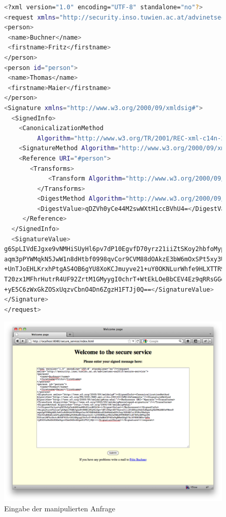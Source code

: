 \documentclass[12pt]{article}
\begin{document}
\begin{figure}
\begin{lstlisting}[language=sh,caption={Manipulierte signierte Anfrage},label=sigXML,basicstyle=\tiny]
<?xml version="1.0" encoding="UTF-8" standalone="no"?>
<request xmlns="http://security.inso.tuwien.ac.at/advinetsec-ss2010/secure-service">
<person>
 <name>Buchner</name>
 <firstname>Fritz</firstname>
</person>
<person id="person">
 <name>Thomas</name>
 <firstname>Maier</firstname>
</person>
<Signature xmlns="http://www.w3.org/2000/09/xmldsig#">
  <SignedInfo>
    <CanonicalizationMethod 
         Algorithm="http://www.w3.org/TR/2001/REC-xml-c14n-20010315#WithComments"/>
    <SignatureMethod Algorithm="http://www.w3.org/2000/09/xmldsig#rsa-sha1"/>
    <Reference URI="#person">
       <Transforms>
            <Transform Algorithm="http://www.w3.org/2000/09/xmldsig#enveloped-signature"/>
         </Transforms>
         <DigestMethod Algorithm="http://www.w3.org/2000/09/xmldsig#sha1"/>
         <DigestValue>qDZVh0yCe44M2swWXtH1ccBVhU4=</DigestValue>
     </Reference>
  </SignedInfo>
  <SignatureValue>
g6SpLIVdEJgxe9vNMHiSUyHl6pv7dP10EgvfD70yrz21iiZtSKoy2hbfoMyptq5b0WLHSCwVNco9
aqm3pPYWMqkN5JwW1n8dHtbf0998qvCor9CVM88dOAkzE3bW6mOxSPt5xy3UZ6B7u1FO9uVMxkyw
+UnTJoEHLKrxhPtgAS4OB6gYU8XoKCJmuyve21+uY0OKNLurWhfe9HLXTTR9HF3iH7KPn4NVqoYK
T20zx1MFhrHutrR4UF92ZrtM1GMyygI0chrT+WtEkLOeBbCEV4Ez9qRRsGGqO7A16V88CBPn+bPw
+yE5C6zWxGkZOSxUqzvCbnO4Dn6ZgzH1FTJj0Q==</SignatureValue>
</Signature>
</request>
\end{lstlisting}
\end{figure}
 \begin{figure}
  \begin{center}
    \includegraphics[scale=0.25]{images/sigIn.png}
  \end{center}
  \caption{Eingabe der manipulierten Anfrage}
  \label{sigIn}
\end{figure}
\end{document}
